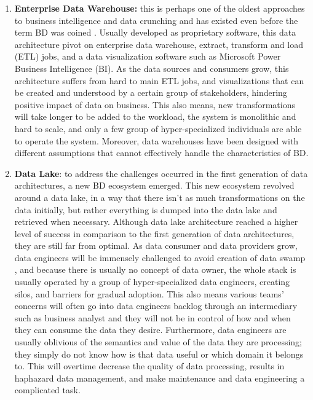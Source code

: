 \documentclass{bmcart}
\begin{document}
\begin{enumerate}
    \item \textbf{Enterprise Data Warehouse:} this is perhaps one of the oldest approaches to business intelligence and data crunching and has existed even before the term BD was coined \cite{leonard2011design}. Usually developed as proprietary software, this data architecture pivot on enterprise data warehouse, extract, transform and load (ETL) jobs, and a data visualization software such as Microsoft Power Business Intelligence (BI). As the data sources and consumers grow, this architecture suffers from hard to main ETL jobs, and visualizations that can be created and understood by a certain group of stakeholders, hindering positive impact of data on business. This also means, new transformations will take longer to be added to the workload, the system is monolithic and hard to scale, and only a few group of hyper-specialized individuals are able to operate the system. Moreover, data warehouses have been designed with different assumptions that cannot effectively handle the characteristics of BD.
    \item \textbf{Data Lake}: to address the challenges occurred in the first generation of data architectures, a new BD ecosystem emerged. This new ecosystem revolved around a data lake, in a way that there isn't as much transformations on the data initially, but rather everything is dumped into the data lake and retrieved when necessary. Although data lake architecture reached a higher level of success in comparison to the first generation of data architectures, they are still far from optimal. As data consumer and data providers grow, data engineers will be immensely challenged to avoid creation of data swamp \cite{brackenbury2018draining}, and because there is usually no concept of data owner, the whole stack is usually operated by a group of hyper-specialized data engineers, creating silos, and barriers for gradual adoption. This also means various teams' concerns will often go into data engineers backlog through an intermediary such as business analyst and they will not be in control of how and when they can consume the data they desire. Furthermore, data engineers are usually oblivious of the semantics and value of the data they are processing; they simply do not know how is that data useful or which domain it belongs to. This will overtime decrease the quality of data processing, results in haphazard data management, and make maintenance and data engineering a complicated task. 

\end{enumerate}
\end{document}
